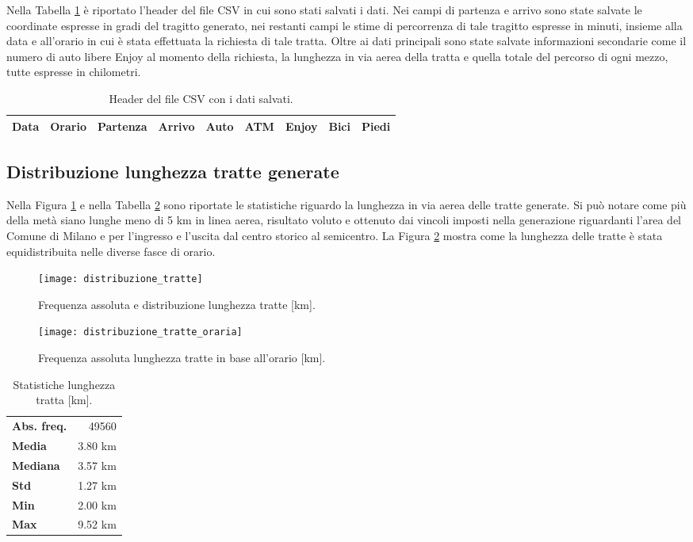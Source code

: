 Nella Tabella \ref{table:7} è riportato l'header del file CSV in cui sono stati salvati i dati. Nei campi di partenza e arrivo sono state salvate le coordinate espresse in gradi del tragitto generato, nei restanti campi le stime di percorrenza di tale tragitto espresse in minuti, insieme alla data e all'orario in cui è stata effettuata la richiesta di tale tratta. Oltre ai dati principali sono state salvate informazioni secondarie come il numero di auto libere Enjoy al momento della richiesta, la lunghezza in via aerea della tratta e quella totale del percorso di ogni mezzo, tutte espresse in chilometri.

\begin{table}[H]
	\centering
	\begin{tabular}{ | c | c | c | c | c | c | c | c | c | }
		\hline
		Data & Orario & Partenza & Arrivo & Auto & ATM & Enjoy & Bici & Piedi \\
		\hline
	\end{tabular}
	\caption{Header del file CSV con i dati salvati.}
	\label{table:7}
\end{table}

\subsection{Distribuzione lunghezza tratte generate}

Nella Figura \ref{image:2} e nella Tabella \ref{table:2} sono riportate le statistiche riguardo la lunghezza in via aerea delle tratte generate. Si può notare come più della metà siano lunghe meno di 5 km in linea aerea, risultato voluto e ottenuto dai vincoli imposti nella generazione riguardanti l'area del Comune di Milano e per l'ingresso e l'uscita dal centro storico al semicentro. La Figura \ref{image:19} mostra come la lunghezza delle tratte è stata equidistribuita nelle diverse fasce di orario.

\begin{figure}[H]
	\centering
	\texttt{[image: distribuzione\_tratte]}
	\caption{Frequenza assoluta e distribuzione lunghezza tratte [km].}
	\label{image:2}
\end{figure}

\begin{figure}[H]
	\centering
	\texttt{[image: distribuzione\_tratte\_oraria]}
	\caption{Frequenza assoluta lunghezza tratte in base all'orario [km].}
	\label{image:19}
\end{figure}

\begin{table}[H]
	\centering
	\begin{tabular}{ | l r | }
		\hline
		\textbf{Abs. freq.} & 49560 \\
		\textbf{Media} & 3.80 km \\
		\textbf{Mediana} & 3.57 km \\
		\textbf{Std} & 1.27 km \\
		\textbf{Min} & 2.00 km \\
		\textbf{Max} & 9.52 km \\
		\hline
	\end{tabular}
	\caption{Statistiche lunghezza tratta [km].}
	\label{table:2}
\end{table}

